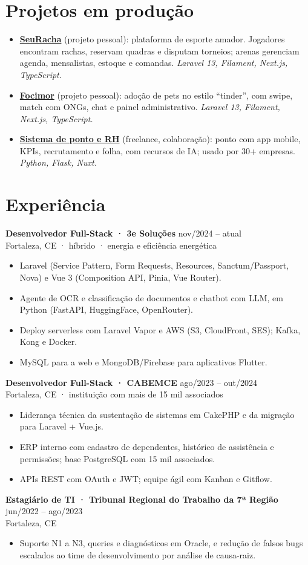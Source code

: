 \documentclass[10pt,a4paper]{article}
\newcommand{\job}[3]{\textbf{#1} \hfill {\color{muted}\small #3}\\{\color{muted}#2}\par\vspace{-2pt}}
\newcommand{\link}[2]{\href{#1}{\color{accent}#2}}
\begin{document}
\section{Projetos em produção}
\begin{itemize}
  \item \textbf{\link{https://seuracha.aragaolabs.com.br}{SeuRacha}} (projeto pessoal): plataforma de esporte amador. Jogadores encontram rachas, reservam quadras e disputam torneios; arenas gerenciam agenda, mensalistas, estoque e comandas. \emph{Laravel 13, Filament, Next.js, TypeScript.}
  \item \textbf{\link{https://focimor.aragaolabs.com.br}{Focimor}} (projeto pessoal): adoção de pets no estilo ``tinder'', com swipe, match com ONGs, chat e painel administrativo. \emph{Laravel 13, Filament, Next.js, TypeScript.}
  \item \textbf{\link{https://pontoalvo.cloud}{Sistema de ponto e RH}} (freelance, colaboração): ponto com app mobile, KPIs, recrutamento e folha, com recursos de IA; usado por 30+ empresas. \emph{Python, Flask, Nuxt.}
\end{itemize}

\section{Experiência}
\job{Desenvolvedor Full-Stack · 3e Soluções}{Fortaleza, CE · híbrido · energia e eficiência energética}{nov/2024 – atual}
\begin{itemize}
  \item Laravel (Service Pattern, Form Requests, Resources, Sanctum/Passport, Nova) e Vue 3 (Composition API, Pinia, Vue Router).
  \item Agente de OCR e classificação de documentos e chatbot com LLM, em Python (FastAPI, HuggingFace, OpenRouter).
  \item Deploy serverless com Laravel Vapor e AWS (S3, CloudFront, SES); Kafka, Kong e Docker.
  \item MySQL para a web e MongoDB/Firebase para aplicativos Flutter.
\end{itemize}
\job{Desenvolvedor Full-Stack · CABEMCE}{Fortaleza, CE · instituição com mais de 15 mil associados}{ago/2023 – out/2024}
\begin{itemize}
  \item Liderança técnica da sustentação de sistemas em CakePHP e da migração para Laravel + Vue.js.
  \item ERP interno com cadastro de dependentes, histórico de assistência e permissões; base PostgreSQL com 15 mil associados.
  \item APIs REST com OAuth e JWT; equipe ágil com Kanban e Gitflow.
\end{itemize}
\job{Estagiário de TI · Tribunal Regional do Trabalho da 7ª Região}{Fortaleza, CE}{jun/2022 – ago/2023}
\begin{itemize}
  \item Suporte N1 a N3, queries e diagnósticos em Oracle, e redução de falsos bugs escalados ao time de desenvolvimento por análise de causa-raiz.
\end{itemize}
\end{document}
